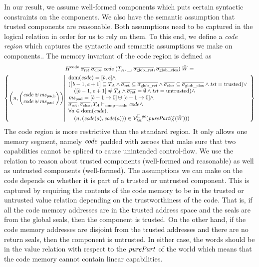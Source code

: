 \begin{jversion}
In our result, we assume well-formed components which puts certain syntactic constraints on the components.
We also have the semantic assumption that trusted components are reasonable.
Both assumptions need to be captured in the logical relation in order for us to rely on them.
To this end, we define a \emph{code region} which captures the syntactic and semantic assumptions we make on components..
The memory invariant of the code region is defined as
\begin{multline*}
  H^\mathrm{code} \; \sigrets \; \sigcloss \; \code \; (\ta,\_,\gsigrets,\gsigcloss) \; \hat{W} =\\
  \left\{\npair{\arraycolsep=0pt\left(\array{l}\code \uplus \mspad,\\ \code \uplus \mspad\endarray\right)} \middle|
    \begin{array}{l}
    \dom(\code) = [\baddr,\eaddr] \wedge \\
      ([\baddr - 1, \eaddr + 1] \subseteq \ta \wedge \sigrets \subseteq \gsigrets \wedge \sigcloss \subseteq \gsigcloss \wedge \trust = \trusted) \vee \\
      \quad ([\baddr-1,\eaddr+1]\mathrel{\#} \ta \wedge \sigrets = \emptyset \wedge \trust =\untrusted) \wedge \\
      \mspad = [\baddr-1 \mapsto 0] \uplus [\eaddr + 1 \mapsto 0]\wedge\\
      \sigrets,\sigcloss,\ta \vdash_{\mathrm{comp-code}} \code \wedge\\
      \forall a \in \dom(\code)\ldotp\\
      \quad\npair{(\code(a),\code(a))} \in \lrvg{\trust}(\purePart{\xi(\hat{W})})
    \end{array}
  \right\}
\end{multline*}
The code region is more restrictive than the standard region.
It only allows one memory segment, namely $\mathit{code}$ padded with zeroes that make sure that two capabilities cannot be spliced to cause unintended control-flow.
We use the relation to reason about trusted components (well-formed and reasonable) as well as untrusted components (well-formed).
The assumptions we can make on the code depends on whether it is part of a trusted or untrusted component.
This is captured by requiring the contents of the code memory to be in the trusted or untrusted value relation depending on the trustworthiness of the code.
That is, if all the code memory addresses are in the trusted address space and the seals are from the global seals, then the component is trusted.
On the other hand, if the code memory addresses are disjoint from the trusted addresses and there are no return seals, then the component is untrusted.
In either case, the words should be in the value relation with respect to the $\purePart{}$ of the world which means that the code memory cannot contain linear capabilities.


\end{jversion}
